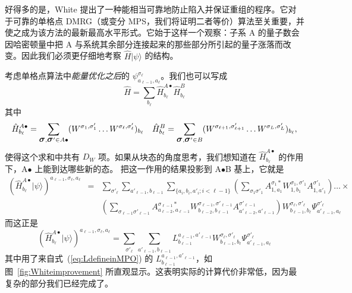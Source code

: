 \documentclass[a4paper,10pt,oneside,onecolumn,1p,times]{elsarticle}
\newcommand{\ket}[1]{\mbox{$| #1  \rangle$}}
\newcommand{\fat}[1]{\mbox{\boldmath$#1$\unboldmath}}	%
\begin{document}
好得多的是，White \cite{White05} 提出了一种能相当可靠地防止陷入并保证重组的程序。它对于可靠的单格点 DMRG（或变分 MPS，我们将证明二者等价）算法至关重要，并使之成为该方法的最新最高水平形式。它始于这样一个观察：子系 A 的量子数会因哈密顿量中把 A 与系统其余部分连接起来的那些部分所引起的量子涨落而改变。因此我们必须更仔细地考察 $\hat{H}\ket{\psi}$ 的结构。

考虑单格点算法中{\em 能量优化之后}的 $\psi^{\sigma_{\ell}}_{a_{\ell-1},a_{\ell}}$。我们也可以写成
\begin{equation}
\hat{H} = \sum_{b_{\ell}} \hat{H}^{A\bullet}_{b_{\ell}} \hat{H}^B_{b_{\ell}}
\end{equation}
其中
\begin{equation}
\hat{H}^{A\bullet}_{b_{\ell}} = \sum_{\fat{\sigma}, \fat{\sigma}'\in A\bullet} ( W^{\sigma_1,\sigma'_1} \ldots W^{\sigma_{\ell},\sigma'_{\ell}} )_{b_{\ell}} \quad
\hat{H}^B_{b_{\ell}} = \sum_{\fat{\sigma}, \fat{\sigma}'\in B} ( W^{\sigma_{\ell+1},\sigma'_{\ell+1}} \ldots W^{\sigma_L,\sigma'_L} )_{b_{\ell}} ,
\end{equation}
使得这个求和中共有 $D_W$ 项。如果从块态的角度思考，我们想知道在 $\hat{H}^{A\bullet}_{b_{\ell}}$ 的作用下，A$\bullet$ 上能到达哪些新的态。
把这一作用的结果投影到 A$\bullet$B 基上，它就是
\begin{eqnarray}
(\hat{H}^{A\bullet}_{b_{\ell}} \ket{\psi})^{a_{\ell-1}, \sigma_{\ell},a_{\ell}} &=&
\sum_{\sigma'_{\ell}} \sum_{a'_{\ell-1},b_{\ell-1}} \sum_{\{ a_i, b_i, a'_i; i<\ell-1\} } \left( \sum_{\sigma_1\sigma'_1} A^{\sigma_1*}_{1,a_1} W^{\sigma_1,\sigma'_1}_{1,b_1} A^{\sigma'_1}_{1,a'_1} \right) \ldots \times \nonumber \\
& & \left( \sum_{\sigma_{\ell-1}\sigma'_{\ell-1}} A^{\sigma_{\ell-1} *}_{a_{\ell-2},a_{\ell-1}} W^{\sigma_{\ell-1},\sigma'_{\ell-1}}_{b_{\ell-2},b_{\ell-1}} A^{\sigma'_{\ell-1}}_{a'_{\ell-2},a'_{\ell-1}} \right)  W^{\sigma_{\ell},\sigma'_{\ell}}_{b_{\ell-1},b_{\ell}} \Psi^{\sigma'_{\ell}}_{a'_{\ell-1},a_{\ell}}
\end{eqnarray}
而这正是
\begin{equation}
(\hat{H}^{A\bullet}_{b_{\ell}} \ket{\psi})^{a_{\ell-1}, \sigma_{\ell},a_{\ell}} =
\sum_{\sigma'_{\ell}} \sum_{a'_{\ell-1},b_{\ell-1}}
L^{a_{\ell-1},a'_{\ell-1}}_{b_{\ell-1}} W^{\sigma_{\ell},\sigma'_{\ell}}_{b_{\ell-1},b_{\ell}} \Psi^{\sigma'_{\ell}}_{a'_{\ell-1},a_{\ell}}
\end{equation}
其中用了来自式~(\ref{eq:LdefineinMPO}) 的 $L^{a_{\ell-1},a'_{\ell-1}}_{b_{\ell-1}}$，如图~\ref{fig:Whiteimprovement} 所直观显示。这表明实际的计算代价非常低，因为最复杂的部分我们已经完成了。
\end{document}
